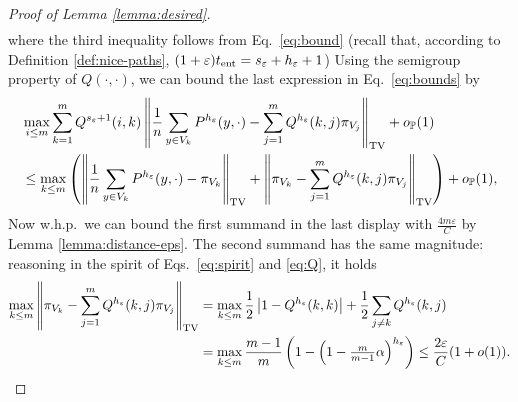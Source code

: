 \documentclass[11pt,oneside]{amsart}
\numberwithin{equation}{section}  %
\theoremstyle{plain}
\newcommand{\whp}{{w.h.p.~}}
\newcommand{\eps}{\varepsilon}
\newcommand{\p}{\mathbb{P}}
\newcommand{\op}{o_{\p}}
\newcommand{\tv}[1]{\left\|#1\right\|_{\rm TV}}
\newcommand{\tent}{t_{\textup{ent}}}
\newcommand{\semi}{{Q}}
\newcommand{\h}{{h_\eps}}
\newcommand{\s}{{s_\eps}}
\begin{document}
\begin{proof}[Proof of Lemma \ref{lemma:desired}]
\begin{equation}
\begin{split}
        \end{split}
\end{equation}
where the third inequality follows from Eq.~\eqref{eq:bound} (recall that, according to Definition \ref{def:nice-paths}, $(1+\eps)\tent=\s+\h+1$) Using the semigroup property of $\semi(\cdot,\cdot)$,
we can bound the last expression in Eq.~\eqref{eq:bounds} by
%
\begin{equation} \label{eq:}
	\begin{split}
		& \max_{i \le m}  \sum_{k=1}^m \semi^{\s+1}(i,k) \tv{ \frac1n\sum_{y \in V_k}P^{\h}(y,\cdot)- \sum_{j=1}^m \semi^{\h}(k,j)\pi_{V_j}}+\op(1) \\
		& \le \max_{k \le m}\left(\tv{ \frac1n\sum_{y\in V_k} P^{\h}(y,\cdot)-\pi_{V_k}}+\tv{\pi_{V_k}-\sum_{j=1}^m \semi^{\h}(k,j)\pi_{V_j}} \right)+\op(1),
	\end{split}
\end{equation}
%
Now \whp we can bound the first summand in the last display with $\frac{4m\eps}{C}$ by Lemma \ref{lemma:distance-eps}. The second summand has the same magnitude: reasoning in the spirit of Eqs.~\eqref{eq:spirit} and \eqref{eq:Q}, it holds
\begin{equation}
	\begin{split}
		\max_{k \le m}\tv { {\pi_{V_k}} - \sum_{j=1}^m \semi^{\h}(k,j){\pi_{V_j}} }
		&=\max_{k\le m} \frac12 \left|1-\semi ^{\h}(k,k)\right|+\frac12 \sum_{j\neq k} \semi^{\h}(k,j) \\
		& = \max_{k\le m} \frac{m-1}{m}\left(1-\left(1-\tfrac m{m-1}\alpha\right)^\h\right)
		\le \frac{2\eps}{C}(1+o(1)). \qedhere
	\end{split}
\end{equation}
\end{proof}
\end{document}
